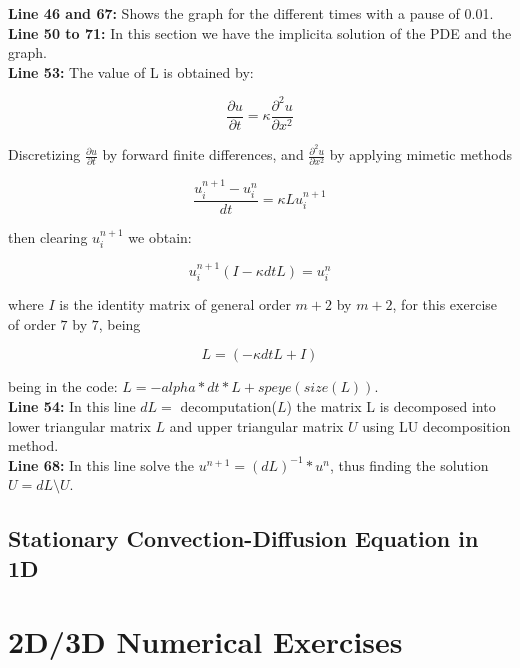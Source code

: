 \textbf{Line 46 and 67:} Shows the graph for the different times with a pause of 0.01. \\


\textbf{Line 50 to 71:} In this section we have the implicita solution of the PDE and the graph. \\

\textbf{Line 53:} The value of L is obtained by:

\begin{equation}
    \frac{\partial u}{\partial t} = \kappa \frac{\partial^{2} u}{\partial x^{2}}
\end{equation}

Discretizing $\frac{\partial u}{\partial t}$ by forward finite differences, and $\frac{\partial^{2} u}{\partial x^{2}}$ by applying mimetic methods

\begin{equation}
    \frac{u^{n+1}_{i} - u^{n}_{i} }{dt} = \kappa L 	u^{n+1}_{i}
\end{equation}

then clearing $u^{n+1}_{i}$ we obtain:


\begin{equation}
    u^{n+1}_{i}(I - \kappa dt L ) = u^{n}_{i}
\end{equation}

where $I$ is the identity matrix of general order $m+2$ by $m+2$, for this exercise of order $7$ by $7$, being

$$  L = (-\kappa dt L + I)$$

being in the code: $ L = -alpha*dt*L +speye(size(L))$.\\

\textbf{Line 54:} In this line $dL=$ decomputation($L$) the matrix L is decomposed into lower triangular matrix $L$ and upper triangular matrix $U$ using LU decomposition method.\\

\textbf{Line 68:} In this line solve the $u^{n+1} =(dL)^{-1}*u^{n}$, thus finding the solution $U=dL \setminus U$.\\

\section{Stationary Convection-Diffusion Equation in 1D}

\chapter{2D/3D Numerical Exercises}

